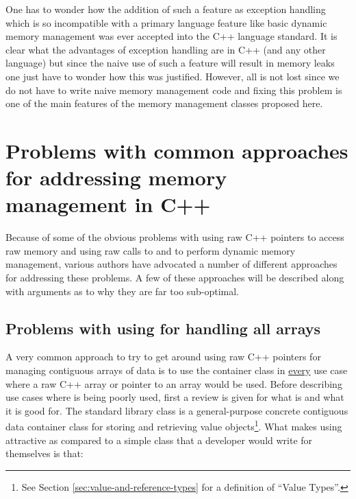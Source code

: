 \documentclass[pdf,ps2pdf,11pt]{SANDreport}
\begin{document}
One has to wonder how the addition of such a feature as exception
handling which is so incompatible with a primary language feature like
basic dynamic memory management was ever accepted into the C++
language standard.  It is clear what the advantages of exception
handling are in C++ (and any other language) but since the naive use
of such a feature will result in memory leaks one just have to wonder
how this was justified.  However, all is not lost since we do not have
to write naive memory management code and fixing this problem is one
of the main features of the memory management classes proposed here.


%
{}\section{Problems with common approaches for addressing memory
management in C++}
\label{sec:current-appraoches-to-mem-mng}
%

Because of some of the obvious problems with using raw C++ pointers to
access raw memory and using raw calls to {} and
{} to perform dynamic memory management, various authors
have advocated a number of different approaches for addressing these
problems.  A few of these approaches will be described along with
arguments as to why they are far too sub-optimal.


%
{}\subsection{Problems with using {} for handling
all arrays}
%

A very common approach to try to get around using raw C++ pointers for
managing contiguous arrays of data is to use the container class
{} in {}\underline{every} use case where a raw C++
array or pointer to an array would be used.  Before describing use
cases where {} is being poorly used, first a review
is given for what {} is and what it is good for.  The
standard library class {} is a general-purpose
concrete contiguous data container class for storing and retrieving
value objects\footnote{See Section
{}\ref{sec:value-and-reference-types} for a definition of ``Value
Types''.}.  What makes using {} attractive as
compared to a simple class that a developer would write for themselves
is that:
\end{document}
